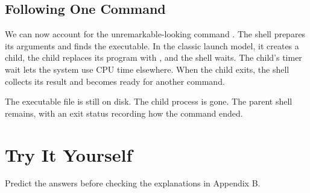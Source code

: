 \documentclass[11pt]{article}
\begin{document}
\subsection*{Following One Command}

We can now account for the unremarkable-looking command .
The shell prepares its arguments and finds the executable.
In the classic launch model, it creates a child, the child replaces its program with , and the shell waits.
The child's timer wait lets the system use CPU time elsewhere.
When the child exits, the shell collects its result and becomes ready for another command.

The executable file is still on disk.
The child process is gone.
The parent shell remains, with an exit status recording how the command ended.

\clearpage
\section*{Try It Yourself}


Predict the answers before checking the explanations in Appendix B.
\end{document}
